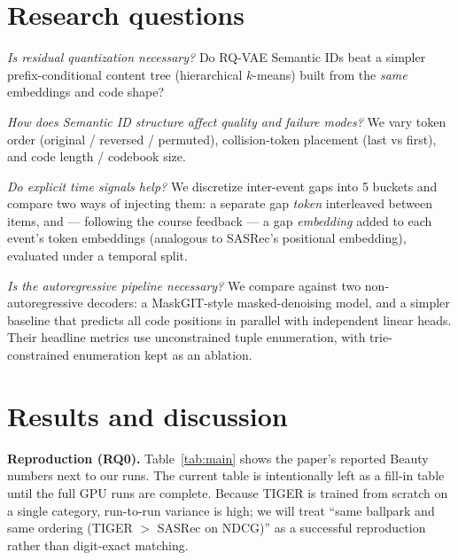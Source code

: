 \documentclass[10pt]{article}
\begin{document}
\section{Research questions}
\begin{description}[leftmargin=2.2em,style=nextline]
\item[\textmd{\textbf{RQ1}}] \emph{Is residual quantization necessary?} Do RQ-VAE
Semantic IDs beat a simpler prefix-conditional content tree (hierarchical
$k$-means) built from the \emph{same} embeddings and code shape?
\item[\textmd{\textbf{RQ2}}] \emph{How does Semantic ID structure affect quality
and failure modes?} We vary token order (original / reversed / permuted),
collision-token placement (last vs first), and code length / codebook size.
\item[\textmd{\textbf{RQ3}}] \emph{Do explicit time signals help?} We discretize
inter-event gaps into 5 buckets and compare two ways of injecting them: a
separate gap \emph{token} interleaved between items, and --- following the course
feedback --- a gap \emph{embedding} added to each event's token embeddings
(analogous to SASRec's positional embedding), evaluated under a temporal split.
\item[\textmd{\textbf{RQ4}}] \emph{Is the autoregressive pipeline necessary?} We
compare against two non-autoregressive decoders: a MaskGIT-style masked-denoising
model, and a simpler baseline that predicts all code positions in parallel with
independent linear heads. Their headline metrics use unconstrained tuple
enumeration, with trie-constrained enumeration kept as an ablation.
\end{description}

\section{Results and discussion}

\textbf{Reproduction (RQ0).} Table~\ref{tab:main} shows the paper's reported
Beauty numbers next to our runs. The current table is intentionally left as a
fill-in table until the full GPU runs are complete. Because TIGER is trained from
scratch on a single category, run-to-run variance is high; we will treat ``same
ballpark and same ordering (TIGER $>$ SASRec on NDCG)'' as a successful
reproduction rather than digit-exact matching.
\end{document}
